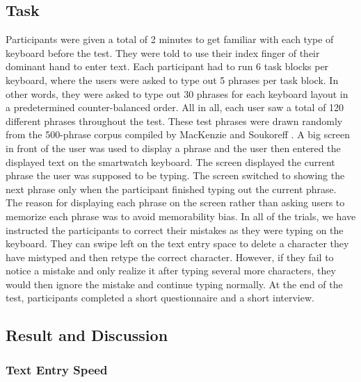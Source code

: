 \subsection{Task}
Participants were given a total of 2 minutes to get familiar with each type of keyboard before the test. They were told to use their index finger of their dominant hand to enter text. Each participant had to run 6 task blocks per keyboard, where the users were asked to type out 5 phrases per task block. In other words, they were asked to type out 30 phrases for each keyboard layout in a predetermined counter-balanced order. All in all, each user saw a total of 120 different phrases throughout the test. These test phrases were drawn randomly from the 500-phrase corpus compiled by MacKenzie and Soukoreff \cite{phrase-set}. A big screen in front of the user was used to display a phrase and the user then entered the displayed text on the smartwatch keyboard. The screen displayed the current phrase the user was supposed to be typing. The screen switched to showing the next phrase only when the participant finished typing out the current phrase. The reason for displaying each phrase on the screen rather than asking users to memorize each phrase was to avoid memorability bias. In all of the trials, we have instructed the participants to correct their mistakes as they were typing on the keyboard. They can swipe left on the text entry space to delete a character they have mistyped and then retype the correct character. However, if they fail to notice a mistake and only realize it after typing several more characters, they would then ignore the mistake and continue typing normally. At the end of the test, participants completed a short questionnaire and a short interview.

\subsection{Result and Discussion}

\subsubsection{Text Entry Speed}

